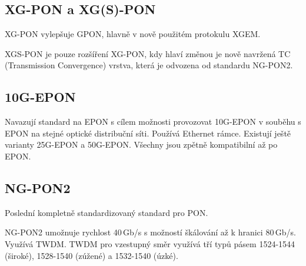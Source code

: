 \subsection{XG-PON a XG(S)-PON}

XG-PON vylepšuje GPON, hlavně v nově použitém protokulu XGEM.

XGS-PON je pouze rozšíření XG-PON, kdy hlaví změnou je nově navržená TC (Transmission Convergence) vrstva, která je odvozena od standardu NG-PON2.

\subsection{10G-EPON}

Navazují standard na EPON s cílem možnosti provozovat 10G-EPON v souběhu s EPON na stejné optické distribuční síti. Používá Ethernet rámce. Existují ještě varianty 25G-EPON a 50G-EPON. Všechny jsou zpětně kompatibilní až po EPON.

\subsection{NG-PON2}
Poslední kompletně standardizovaný standard pro PON.

NG-PON2 umožnuje rychlost 40\,Gb/s s možností škálování až k hranici 80\,Gb/s. Využívá TWDM. TWDM pro vzestupný směr využívá tří typů pásem 1524-1544 (široké), 1528-1540 (zúžené) a 1532-1540 (úzké).

